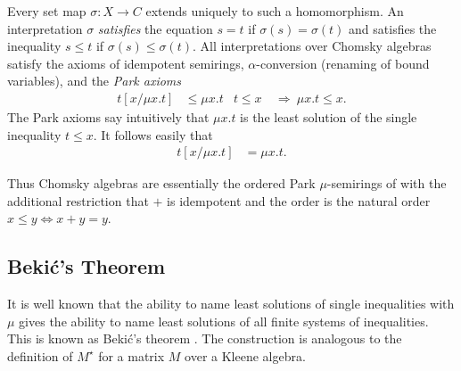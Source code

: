 \documentclass[copyright,creativecommons]{eptcs}
\theoremstyle{remark}
\newcommand\fun{\mathrel\rightarrow}
\newcommand\subst[2]{[#1/#2]}
\newcommand\Imp{\mathrel\Rightarrow}
\newcommand\Iff{\mathrel\Leftrightarrow}
\newcommand{\fhcomment}[1]{\textcolor{red}{[\textbf{Comment (FH)}: {#1}]}}
\newcommand{\dkcomment}[1]{\textcolor{blue}{[\textbf{Comment (DK)}: {#1}]}}
\renewcommand{\fhcomment}[1]{}
\renewcommand{\dkcomment}[1]{}
\begin{document}
Every set map $\sigma:X\fun C$ extends uniquely to such a homomorphism. An interpretation $\sigma$ \emph{satisfies} the equation $s=t$ if $\sigma(s)=\sigma(t)$ and satisfies the inequality $s\leq t$ if $\sigma(s)\leq\sigma(t)$. All interpretations over Chomsky algebras satisfy the axioms of idempotent semirings, $\alpha$-conversion (renaming of bound variables), and the \emph{Park axioms}
\fhcomment{Add: Reference to where they are introduced.}\dkcomment{??}\fhcomment{First or canonical piece of literature that contains the 
Park axioms.  Presumably something Park has written and that subsequently was called Park by somebody else in another paper.  Couldn't find those references, and I'm curious...}\begin{align}
t\subst x{\mu x.t} &\leq \mu x.t & t\leq x\ &\Imp\ \mu x.t \leq x.\label{ax:Park}
\end{align}
The Park axioms say intuitively that $\mu x.t$ is the least solution of the single inequality $t\leq x$.
\fhcomment{Change to: names the least solution}\dkcomment{Ah, the classic dilemma of use vs. mention. Technically you are right but it's a common abuse in algebra and logic. I personally would prefer to stick with ``is'' but willing to go with ``names'' if it makes you happy. But, realize, if we do this, we technically should change the next statement to ``$p\subst x{\mu x.p}$ and $\mu x.p$ name the same element under any interpretation.''}\fhcomment{OK.  I was suggesting ``names'' only as linguistic connection to the occurrence of ``name'' in ``to name least solutions'' below.}It follows easily that
\begin{align}
t\subst x{\mu x.t} &= \mu x.t.\label{ax:Park1}
\end{align}

Thus Chomsky algebras are essentially the ordered Park $\mu$-semirings of \cite{EsikLeiss05} with the additional restriction that $+$ is idempotent and the order is the natural order $x\leq y \Iff x + y = y$.

\subsection{Beki\'c's Theorem}
\label{sec:Bekic}

It is well known that the ability to name least solutions of single inequalities with $\mu$ gives the ability to name least solutions of all finite systems of inequalities. This is known as Beki\'c's theorem \cite{bekic1984}. The construction is analogous to the definition of $M^\star$ for a matrix $M$ over a Kleene algebra. 
\fhcomment{Add: Formulate Beki\'c's Theorem: Algebraic closure for systems of inequations over $\E X$, not just $\P X$.}\dkcomment{I suggest not wasting space with this. It is well known and done in detail in Winskel's book and \'Esik and Leiss, and we give the references below. We also do the 2x2 example, which is more instructive than any general formulation would be.}\fhcomment{OK.}
\end{document}
